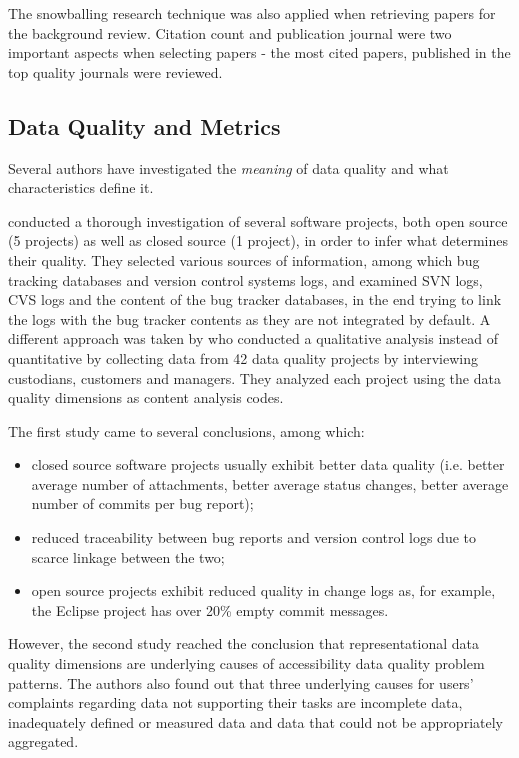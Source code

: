 \documentclass{mprop}
\begin{document}
The snowballing research technique was also applied when retrieving papers for the
background review. Citation count and publication journal were two important aspects 
when selecting papers - the most cited papers, published in the top quality journals were reviewed.

\subsection{Data Quality and Metrics}\label{data_quality}

Several authors have investigated the \emph{meaning} of data quality and
what characteristics define it.

\citet{bachmann2009software} conducted a thorough investigation of several
software projects, both open source (5 projects) as well as closed source (1 
project), in order to infer what determines their quality. They selected 
various sources of information, among which bug tracking 
databases and version control systems logs, and examined SVN logs, CVS logs
and the content of the bug tracker databases, in the end trying to link 
the logs with the bug tracker contents as they are not integrated by default. 
A different approach was taken by \citet{strong1997data} who conducted a qualitative analysis
instead of quantitative by collecting data from 42 data quality projects by 
interviewing custodians, customers and managers. They analyzed each project
using the data quality dimensions as content analysis codes.

The first study came to several conclusions, among which:
  \begin{itemize}
    \item closed source software projects usually exhibit better data quality 
    (i.e. better average number of attachments, better average status changes, 
    better average number of commits per bug report);
    \item reduced traceability between bug reports and version control logs
    due to scarce linkage between the two;
    \item open source projects exhibit reduced quality in change logs as,
    for example, the Eclipse project has over 20\% empty commit messages.
  \end{itemize}

However, the second study reached the conclusion that representational data 
quality dimensions are underlying causes of accessibility data quality problem
patterns. The authors also found out that three underlying causes for users'
complaints regarding data not supporting their tasks are incomplete data, 
inadequately defined or measured data and data that could not be appropriately
aggregated.
\end{document}
